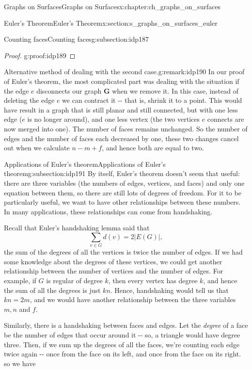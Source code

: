 \documentclass[oneside,10pt,]{book}
\numberwithin{equation}{section}
\newcommand{\bfG}{\mathbf{G}}
\begin{document}
\begin{chapterptx}{Graphs on Surfaces}{}{Graphs on Surfaces}{}{}{x:chapter:ch_graphs_on_surfaces}
\begin{sectionptx}{Euler's Theorem}{}{Euler's Theorem}{}{}{x:section:s_graphs_on_surfaces_euler}
\begin{subsectionptx}{Counting faces}{}{Counting faces}{}{}{g:subsection:idp187}
\begin{proof}{}{g:proof:idp189}
\end{proof}
\begin{remark}{Alternative method of dealing with the second case.}{g:remark:idp190}%
In our proof of Euler's theorem, the most complicated part was dealing with the situation if the edge \(e\) disconnects our graph \(\bfG\) when we remove it. In this case, instead of deleting the edge \(e\) we can contract it -{}-{} that is, shrink it to a point.  This would have result in a graph that is still planar and still connected, but with one less edge (\(e\) is no longer around), and one less vertex (the two vertices \(e\) connects are now merged into one).  The number of faces remains unchanged.  So the number of edges and the number of faces each decreased by one, these two changes cancel out when we calculate \(n-m+f\), and hence both are equal to two.%
\end{remark}
\end{subsectionptx}
%
%
\typeout{************************************************}
\typeout{************************************************}
%
\begin{subsectionptx}{Applications of Euler's theorem}{}{Applications of Euler's theorem}{}{}{g:subsection:idp191}
By itself, Euler's theorem doesn't seem that useful: there are three variables (the numbers of edges, vertices, and faces) and only one equation between them, so there are still lots of degrees of freedom.  For it to be particularly useful, we want to have other relationships between these numbers.  In many applications, these relationships can come from handshaking.%
\par
Recall that Euler's handshaking lemma said that%
\begin{equation*}
\sum_{v\in G} d(v)=2 |E(G)|,
\end{equation*}
the sum of the degrees of all the vertices is twice the number of edges.  If we had some knowledge about the degrees of these vertices, we could get another relationship between the number of vertices and the number of edges.  For example, if \(G\) is regular of degree \(k\), then every vertex has degree \(k\), and hence the sum of all the degrees is just \(kn\).  Hence, handshaking would tell us that \(kn=2m\), and we would have another relationship between the three variables \(m,n\) and \(f\).%
\par
Similarly, there is a handshaking between faces and edges.  Let the \emph{degree} of a face be the number of edges that occur around it -{}-{} so, a triangle would have degree three.  Then, if we sum up the degrees of all the faces, we're counting each edge twice again -{}-{} once from the face on its left, and once from the face on its right.  so we have%

\end{subsectionptx}
\end{sectionptx}
\end{chapterptx}
\end{document}
